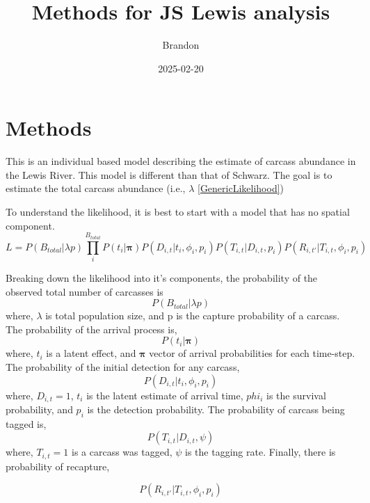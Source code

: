 \documentclass[
]{article}
\title{Methods for JS Lewis analysis}
\author{Brandon}
\date{2025-02-20}
\begin{document}
\maketitle

\hypertarget{methods}{%
\section{Methods}\label{methods}}

This is an individual based model describing the estimate of carcass
abundance in the Lewis River. This model is different than that of
Schwarz. The goal is to estimate the total carcass abundance (i.e.,
\(\lambda\) \ref{GenericLikelihood})

To understand the likelihood, it is best to start with a model that has
no spatial component. \begin{equation} \label{eq:Likelihood}
  L = P(B_{total}|\lambda p)\prod_i^{B_{total}} P(t_i|\boldsymbol{\pi})P(D_{i,t}|t_i,\phi_i,p_i)P(T_{i,t}|D_{i,t},p_i)P(R_{i,t\prime}|T_{i,t},\phi_i,p_i) 
\end{equation}

Breaking down the likelihood into it's components, the probability of
the observed total number of carcasses is
\begin{equation}\label{P_PopulationSize}
  P(B_{total}|\lambda p)
\end{equation} where, \(\lambda\) is total population size, and p is the
capture probability of a carcass. The probability of the arrival process
is, \begin{equation}\label{P_arrival}
  P(t_i|\boldsymbol{\pi})
\end{equation} where, \(t_i\) is a latent effect, and
\(\boldsymbol{\pi}\) vector of arrival probabilities for each time-step.
The probability of the initial detection for any carcass,
\begin{equation}\label{P_initial detection}
  P(D_{i,t}|t_i,\phi_i,p_i)
\end{equation} where, \(D_{i,t} = 1\), \(t_i\) is the latent estimate of
arrival time, \(phi_i\) is the survival probability, and \(p_i\) is the
detection probability. The probability of carcass being tagged is,
\begin{equation}\label{P_tagging}
  P(T_{i,t}|D_{i,t},\psi)
\end{equation} where, \(T_{i,t}=1\) is a carcass was tagged, \(\psi\) is
the tagging rate. Finally, there is probability of recapture,

\begin{equation}\label{P_recapture}
  P(R_{i,t\prime}|T_{i,t},\phi_i,p_i)
\end{equation}
\end{document}
